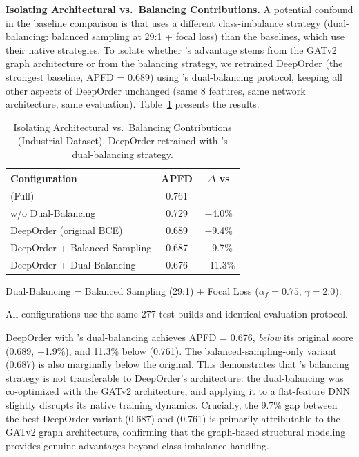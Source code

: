 \textbf{Isolating Architectural vs.\ Balancing Contributions.}
A potential confound in the baseline comparison is that \filopriori{} uses a
different class-imbalance strategy (dual-balancing: balanced sampling at 29:1
+ focal loss) than the baselines, which use their native strategies. To
isolate whether \filopriori{}'s advantage stems from the GATv2 graph
architecture or from the balancing strategy, we retrained DeepOrder (the
strongest baseline, APFD = 0.689) using \filopriori{}'s dual-balancing
protocol, keeping all other aspects of DeepOrder unchanged (same 8 features,
same network architecture, same evaluation).
Table~\ref{tab:deeporder_dualbalancing} presents the results.

\begin{table}[!t]
\centering
\caption{Isolating Architectural vs.\ Balancing Contributions (Industrial
Dataset). DeepOrder retrained with \filopriori{}'s dual-balancing strategy.}
\label{tab:deeporder_dualbalancing}
\footnotesize
\begin{tabular}{lcc}
\toprule
\textbf{Configuration} & \textbf{APFD} & \textbf{$\Delta$ vs \filopriori{}} \\
\midrule
\filopriori{} (Full) & 0.761 & -- \\
\filopriori{} w/o Dual-Balancing & 0.729 & $-$4.0\% \\
\midrule
DeepOrder (original BCE) & 0.689 & $-$9.4\% \\
DeepOrder + Balanced Sampling & 0.687 & $-$9.7\% \\
DeepOrder + Dual-Balancing & 0.676 & $-$11.3\% \\
\bottomrule
\end{tabular}
\begin{tablenotes}
\small
\item Dual-Balancing = Balanced Sampling (29:1) + Focal Loss ($\alpha_f\!=\!0.75$, $\gamma\!=\!2.0$).
\item All configurations use the same 277 test builds and identical evaluation protocol.
\end{tablenotes}
\end{table}

DeepOrder with \filopriori{}'s dual-balancing achieves APFD = 0.676,
\emph{below} its original score (0.689, $-$1.9\%), and 11.3\% below
\filopriori{} (0.761). The balanced-sampling-only variant (0.687) is also
marginally below the original. This demonstrates that \filopriori{}'s
balancing strategy is not transferable to DeepOrder's architecture:
the dual-balancing was co-optimized with the GATv2 architecture, and
applying it to a flat-feature DNN slightly disrupts its native training
dynamics. Crucially, the 9.7\% gap between the best DeepOrder variant
(0.687) and \filopriori{} (0.761) is primarily attributable to the GATv2
graph architecture, confirming that the graph-based structural modeling
provides genuine advantages beyond class-imbalance handling.

